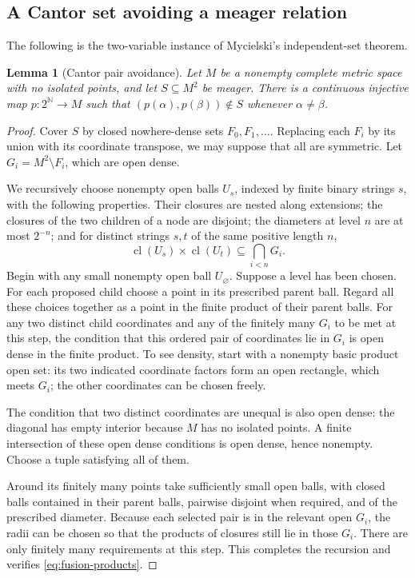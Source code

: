\documentclass[11pt,a4paper]{article}
\newcommand{\N}{\mathbb N}
\newcommand{\cl}{\operatorname{cl}}
\newtheorem{lemma}[theorem]{Lemma}
\theoremstyle{definition}\newtheorem{definition}[theorem]{Definition}
\theoremstyle{remark}\newtheorem{remark}[theorem]{Remark}
\begin{document}
\subsection{A Cantor set avoiding a meager relation}
\label{app:mycielski}
The following is the two-variable instance of Mycielski's independent-set theorem.\cite{Mycielski}
\begin{lemma}[Cantor pair avoidance]\label{lem:mycielski}
Let $M$ be a nonempty complete metric space with no isolated points, and let $S\subseteq M^2$ be meager. There is a continuous injective map $p:2^{\N}\to M$ such that $(p(\alpha),p(\beta))\notin S$ whenever $\alpha\ne\beta$.
\end{lemma}
\begin{proof}
Cover $S$ by closed nowhere-dense sets $F_0,F_1,\ldots$. Replacing each $F_i$ by its union with its coordinate transpose, we may suppose that all are symmetric. Let $G_i=M^2\setminus F_i$, which are open dense.

We recursively choose nonempty open balls $U_s$, indexed by finite binary strings $s$, with the following properties. Their closures are nested along extensions; the closures of the two children of a node are disjoint; the diameters at level $n$ are at most $2^{-n}$; and for distinct strings $s,t$ of the same positive length $n$,
\begin{equation}\label{eq:fusion-products}
       \cl(U_s)\times\cl(U_t)\subseteq\bigcap_{i<n}G_i.
\end{equation}
Begin with any small nonempty open ball $U_{\varnothing}$. Suppose a level has been chosen. For each proposed child choose a point in its prescribed parent ball. Regard all these choices together as a point in the finite product of their parent balls. For any two distinct child coordinates and any of the finitely many $G_i$ to be met at this step, the condition that this ordered pair of coordinates lie in $G_i$ is open dense in the finite product. To see density, start with a nonempty basic product open set: its two indicated coordinate factors form an open rectangle, which meets $G_i$; the other coordinates can be chosen freely.

The condition that two distinct coordinates are unequal is also open dense: the diagonal has empty interior because $M$ has no isolated points. A finite intersection of these open dense conditions is open dense, hence nonempty. Choose a tuple satisfying all of them.

Around its finitely many points take sufficiently small open balls, with closed balls contained in their parent balls, pairwise disjoint when required, and of the prescribed diameter. Because each selected pair is in the relevant open $G_i$, the radii can be chosen so that the products of closures still lie in those $G_i$. There are only finitely many requirements at this step. This completes the recursion and verifies \eqref{eq:fusion-products}.


\end{proof}
\end{document}
